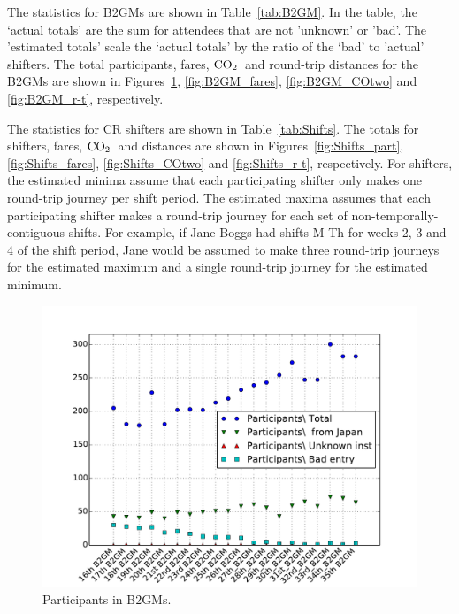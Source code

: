 \documentclass[12pt]{article}
\newcommand{\COtwo}{${\rm CO}_2$}
\begin{document}
The statistics for B2GMs are shown in Table~\ref{tab:B2GM}. In the table, the `actual totals' are the sum for attendees that are not 'unknown' or 'bad'. 
The 'estimated totals' scale the `actual totals' by the ratio of the `bad' to 'actual' shifters. 
The total participants, fares, \COtwo\ and round-trip distances for the B2GMs are shown in 
Figures~\ref{fig:B2GM_part}, \ref{fig:B2GM_fares}, \ref{fig:B2GM_COtwo} and \ref{fig:B2GM_r-t}, respectively. 


The statistics for CR shifters are shown in Table~\ref{tab:Shifts}.
The totals for shifters, fares, \COtwo\ and distances are shown in 
Figures~\ref{fig:Shifts_part}, \ref{fig:Shifts_fares}, \ref{fig:Shifts_COtwo} and \ref{fig:Shifts_r-t}, respectively. 
For shifters, the estimated minima assume that each participating shifter only makes one round-trip journey per shift period. 
The estimated maxima assumes that each participating shifter makes a round-trip journey for each set of non-temporally-contiguous shifts. 
For example, if Jane Boggs had shifts M-Th for weeks 2, 3 and 4 of the shift period, Jane would be assumed to make three round-trip journeys for the estimated maximum and a single round-trip journey for the estimated minimum. 



 


\begin{figure}[htbp]
\begin{center}
\includegraphics[width=\textwidth]{../FIGURES/B2GM_Participants.pdf}
\caption{Participants in B2GMs. }
\label{fig:B2GM_part}
\end{center}
\end{figure}
\end{document}

